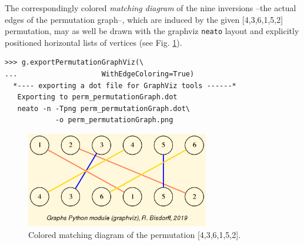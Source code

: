 The correspondingly colored \emph{matching diagram} of the nine inversions --the actual edges of the permutation graph--, which are induced by the given [4,3,6,1,5,2] permutation, may as well be drawn with the graphviz \texttt{neato} layout and explicitly positioned horizontal lists of vertices (see Fig. \ref{fig:25.6}).
\begin{lstlisting}
>>> g.exportPermutationGraphViz(\
...                    WithEdgeColoring=True)
  *---- exporting a dot file for GraphViz tools ------*
   Exporting to perm_permutationGraph.dot
   neato -n -Tpng perm_permutationGraph.dot\
            -o perm_permutationGraph.png
\end{lstlisting}
\begin{figure}[h]
\sidecaption
\includegraphics[width=8cm]{Figures/perm_permutationGraph.png}
\caption{Colored matching diagram of the permutation [4,3,6,1,5,2].} 
\label{fig:25.6}       %
\end{figure}

